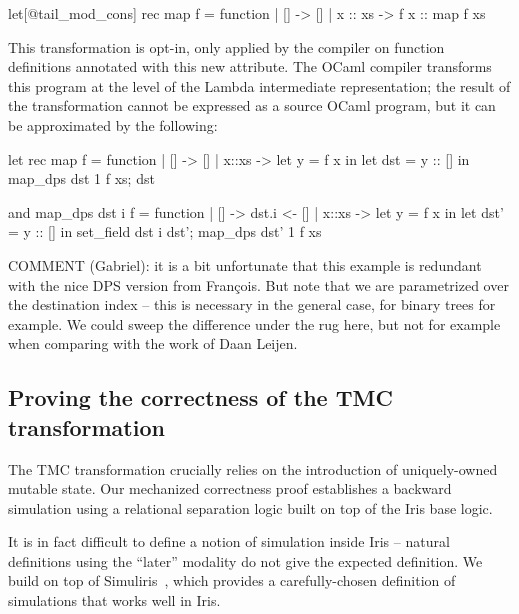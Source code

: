 \nocite{sobel-friedman-98}
\nocite{minamide-98}


\begin{OCaml}
let[@tail_mod_cons] rec map f = function
| [] -> []
| x :: xs -> f x :: map f xs
\end{OCaml}

This transformation is opt-in, only applied by the compiler on function definitions annotated with this new  attribute. The OCaml compiler transforms this program at the level of the Lambda intermediate representation; the result of the transformation cannot be expressed as a source OCaml program, but it can be approximated by the following:

\hspace{-1.6em}
\begin{minipage}{0.5\linewidth}
\begin{OCaml}
let rec map f = function
| [] -> []
| x::xs ->
  let y = f x in
  let dst = y :: [] in
  map_dps dst 1 f xs;
  dst
\end{OCaml}
\end{minipage}
\hfill
\begin{minipage}{0.5\linewidth}
\begin{OCaml}
and map_dps dst i f = function
| [] ->
  dst.i <- []
| x::xs ->
  let y = f x in
  let dst' = y :: [] in
  set_field dst i dst';
  map_dps dst' 1 f xs
\end{OCaml}
\end{minipage}

COMMENT (Gabriel): it is a bit unfortunate that this example is redundant with the nice DPS version from François. But note that we are parametrized over the destination index -- this is necessary in the general case, for binary trees for example. We could sweep the difference under the rug here, but not for example when comparing with the work of Daan Leijen.

\subsection{Proving the correctness of the TMC transformation}

The TMC transformation crucially relies on the introduction of uniquely-owned mutable state. Our mechanized correctness proof establishes a backward simulation using a relational separation logic built on top of the Iris base logic.

It is in fact difficult to define a notion of simulation inside Iris -- natural definitions using the ``later'' modality do not give the expected definition. We build on top of Simuliris~\citep*{TODO-simuliris}, which provides a carefully-chosen definition of simulations that works well in Iris.

